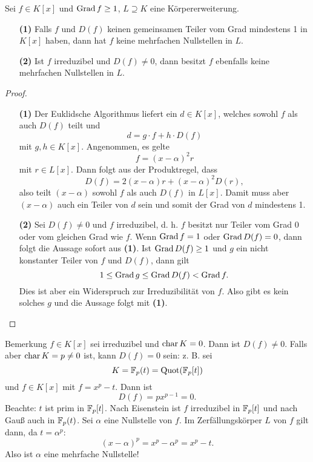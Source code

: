 \begin{lemma}\label{skript:14.10}
	Sei $f\in K[x]$ und $\operatorname{Grad} f\geq1$, $L\supseteq K$ eine Körpererweiterung.
	\begin{itemize}
		\item[\textbf{(1)}]
		Falls $f$ und $D(f)$ keinen gemeinsamen Teiler vom Grad mindestens 1 in $K[x]$ haben, dann hat $f$ keine mehrfachen Nullstellen in $L$.
		\item[\textbf{(2)}]
		Ist $f$ irreduzibel und $D(f)\neq0$, dann besitzt $f$ ebenfalls keine mehrfachen Nullstellen in $L$.
	\end{itemize}
\end{lemma}
\begin{proof}
	\begin{itemize}
		\item[\textbf{(1)}]
		Der Euklidsche Algorithmus liefert ein $d\in K[x]$, welches sowohl $f$ als auch $D(f)$ teilt und
		\[d=g\cdot f+h\cdot D(f)\]
		mit $g,h\in K[x]$. Angenommen, es gelte
		\[f=(x-\alpha)^2 r\]
		mit $r\in L[x]$. Dann folgt aus der Produktregel, dass
		\[D(f)=2(x-\alpha)r+(x-\alpha)^2D(r),\]
		also teilt $(x-\alpha)$ sowohl $f$ als auch $D(f)$ in $L[x]$. Damit muss aber $(x-\alpha)$ auch ein Teiler von $d$ sein und somit der Grad von $d$ mindestens 1.
		\item[\textbf{(2)}]
		Sei $D(f)\neq0$ und $f$ irreduzibel, d. h. $f$ besitzt nur Teiler vom Grad 0 oder vom gleichen Grad wie $f$. Wenn $\operatorname{Grad} f=1$ oder $\operatorname{Grad} D(f)=0$, dann folgt die Aussage sofort aus \textbf{(1)}. Ist $\operatorname{Grad} D(f)\geq1$ und $g$ ein nicht konstanter Teiler von $f$ und $D(f)$, dann gilt
		\[1\leq\operatorname{Grad} g\leq\operatorname{Grad} D(f)<\operatorname{Grad} f.\]
		Dies ist aber ein Widerspruch zur Irreduzibilität von $f$. Also gibt es kein solches $g$ und die Aussage folgt mit \textbf{(1)}.
	\end{itemize}
\end{proof}
\begin{genericdf}{Bemerkung}\label{skript:14.11}
	$f\in K[x]$ sei irreduzibel und $\operatorname{char} K=0$. Dann ist $D(f)\neq0$. Falls aber $\operatorname{char} K=p\neq0$ ist, kann $D(f)=0$ sein: z. B. sei
	\[K=\mathbb{F}_p(t)=\operatorname{Quot}(\mathbb{F}_p[t])\]
	und $f\in K[x]$ mit $f=x^p-t$. Dann ist
	\[D(f)=px^{p-1}=0.\]
	Beachte: $t$ ist prim in $\mathbb{F}_p[t]$. Nach Eisenstein ist $f$ irreduzibel in $\mathbb{F}_p[t]$ und nach Gauß auch in $\mathbb{F}_p(t)$. Sei $\alpha$ eine Nullstelle von $f$. Im Zerfällungskörper $L$ von $f$ gilt dann, da $t=\alpha^p$:
	\[(x-\alpha)^p=x^p-\alpha^p=x^p-t.\]
	Also ist $\alpha$ eine mehrfache Nullstelle!
\end{genericdf}

